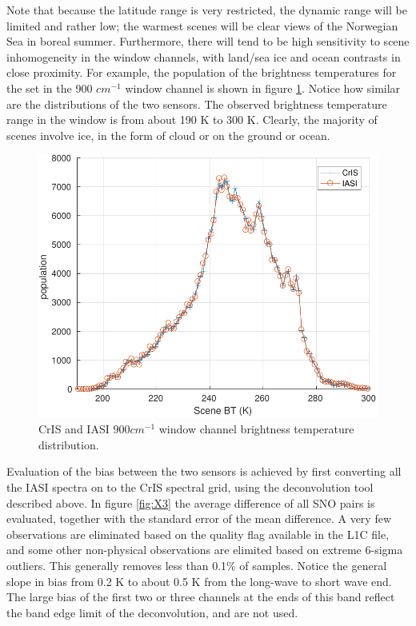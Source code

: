 \documentclass[twocolumn,10pt]{article}
\begin{document}
Note that because the latitude range is very restricted, the dynamic range will be limited and rather low; the warmest scenes will be clear views of the Norwegian Sea in boreal summer.  Furthermore, there will tend to be high sensitivity to scene inhomogeneity in the window channels, with land/sea ice and ocean contrasts in close proximity. For example, the population of
the brightness temperatures for the set in the 900 $cm^{-1}$ window channel is shown in figure \ref{fig:X2}. Notice how similar are the distributions of the two sensors.
The observed brightness temperature range in the window is from about 190 K to 300 K. Clearly,
the majority of scenes involve ice, in the form of cloud or on the ground or ocean.

\begin{figure}[htb]
\centering
\includegraphics[width=\linewidth]{./figs/IC_jplSNO_900wn_hist_vs_scene.pdf}
\caption{\label{fig:orgparagraph4}
  CrIS and IASI $900 cm^{-1}$ window channel brightness temperature distribution.}
\label{fig:X2}
\end{figure}

Evaluation of the bias between the two sensors is achieved by first converting all the
IASI spectra on to the CrIS spectral grid, using the deconvolution tool described above.
In figure \ref{fig:X3} the average difference of all SNO pairs
is evaluated, together with the standard error of the mean difference. A very few
observations are eliminated based on the quality flag available in the L1C file, and some other non-physical observations are elimited based on extreme 6-sigma outliers. This generally removes less than  0.1\%  of samples. Notice the general slope in bias from 0.2 K to about 0.5 K from the long-wave to short wave end. The large bias of the first two or three channels at the ends of this band reflect the band edge limit of the deconvolution, and are not used.
\end{document}
